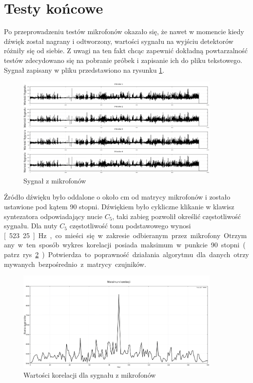 \documentclass[eng,printmode]{mgr}
\begin{document}
\section{Testy końcowe}
Po przeprowadzeniu testów mikrofonów okazało się, że nawet w momencie kiedy dźwięk został nagrany i odtworzony, wartości sygnału  na wyjściu detektorów różniły się od siebie. Z uwagi na ten fakt chcąc zapewnić dokładną powtarzalność testów zdecydowano się na pobranie próbek i zapisanie ich do pliku tekstowego. Sygnał zapisany w pliku przedstawiono na rysunku \ref{fig-micdata}. 
\begin{figure}[ht!]

    \centering

  \includegraphics[width=0.9\textwidth, angle=0]{micdata.png}

    \caption{Sygnał z mikrofonów}
 \label{fig-micdata}
    

\end{figure}
Źródło dźwięku było oddalone o około \unit[15]{cm} od matrycy mikrofonów i zostało ustawione pod kątem 90 stopni. Dźwiękiem było cykliczne klikanie w klawisz syntezatora odpowiadający nucie $C_5$, taki zabieg pozwolił określić częstotliwość sygnału. Dla nuty $C_5$ częstotliwość tonu podstawowego wynosi \unit[523.25]{Hz}, co  mieści się w zakresie odbieranym przez mikrofony. Otrzymany w ten sposób wykres korelacji posiada maksimum w punkcie 90 stopni (patrz rys. \ref{fig-mickor}). Potwierdza to poprawność działania algorytmu dla danych otrzymywanych bezpośrednio z matrycy czujników.

\begin{figure}[!ht]

    \centering

  \includegraphics[width=0.9\textwidth, angle=0]{maksimum.png}

    \caption{Wartości korelacji dla sygnału z mikrofonów}
 \label{fig-mickor}
    

\end{figure}
\end{document}
